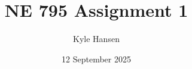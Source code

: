 \documentclass{article}
\title{NE 795 Assignment 1}
\author{Kyle Hansen}
\date{12 September 2025}
\begin{document}
\maketitle

\section{}
\end{document}
